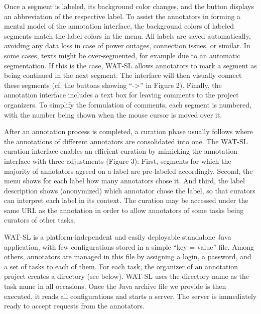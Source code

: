 \begin{description}
    Once a segment is labeled, its background color
    changes, and the button displays an abbreviation
    of the respective label. To assist the annotators in
    forming a mental model of the annotation interface, the background colors of labeled segments
    match the label colors in the menu. All labels are
    saved automatically, avoiding any data loss in case
    of power outages, connection issues, or similar.
    In some cases, texts might be over-segmented,
    for example due to an automatic segmentation. If
    this is the case, WAT-SL allows annotators to mark
    a segment as being continued in the next segment.
    The interface will then visually connect these segments (cf. the buttons showing “->” in Figure 2).
    Finally, the annotation interface includes a text
    box for leaving comments to the project organizers. To simplify the formulation of comments,
    each segment is numbered, with the number being
    shown when the mouse cursor is moved over it.

    After an annotation process is completed, a curation phase usually follows where the annotations
    of different annotators are consolidated into one.
    The WAT-SL curation interface enables an efficient curation by mimicking the annotation interface with three adjustments (Figure 3): First, segments for which the majority of annotators agreed
    on a label are pre-labeled accordingly. Second, the
    menu shows for each label how many annotators
    chose it. And third, the label description shows
    (anonymized) which annotator chose the label, so
    that curators can interpret each label in its context.
    The curation may be accessed under the same
    URL as the annotation in order to allow annotators
    of some tasks being curators of other tasks.

    WAT-SL is a platform-independent and easily deployable standalone Java application, with few
    configurations stored in a simple “key = value”
    file. Among others, annotators are managed in this
    file by assigning a login, a password, and a set of
    tasks to each of them. For each task, the organizer
    of an annotation project creates a directory (see
    below). WAT-SL uses the directory name as the
    task name in all occasions. Once the Java archive
    file we provide is then executed, it reads all configurations and starts a server. The server is immediately ready to accept requests from the annotators.

  \end{description}

